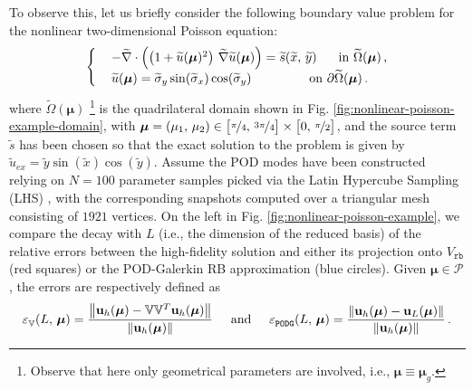 \documentclass[12pt, a4paper, twoside, openright, notitlepage]{report}
\numberwithin{equation}{chapter}
\theoremstyle{theorem}
\theoremstyle{definition}
\theoremstyle{remark}
\theoremstyle{proposition}
\numberwithin{figure}{chapter}
\newcommand{\norm}[1]{\left\lVert#1\right\rVert}
\newcommand{\wt}[1]{\widetilde{#1}}
\newcommand{\bg}[1]{\boldsymbol{#1}}
\begin{document}
		\noindent To observe this, let us briefly consider the following boundary value problem for the nonlinear two-dimensional Poisson equation:
		\begin{equation}
			\label{eq:nonlinear-poisson-example}
			\begin{cases}
				& - \wt{\nabla} \cdot \left( \big( 1 + \wt{u}(\bg{\mu})^2 \big) ~ \wt{\nabla} \wt{u}(\bg{\mu}) \right) = \wt{s}(\wt{x}, \, \wt{y}) \hspace*{0.6cm} \text{in $\wt{\Omega}(\boldsymbol{\mu})$} \, , \\
				& \wt{u}(\bg{\mu}) = \wt{\sigma}_y \sin(\wt{\sigma}_x) \cos(\wt{\sigma}_y) \hspace*{1.6cm} \text{on $\partial \wt{\Omega}(\boldsymbol{\mu})$} \, .
			\end{cases}
		\end{equation}
		where $\wt{\Omega}(\boldsymbol{\mu})$ \footnote{Observe that here only geometrical parameters are involved, i.e., $\bg{\mu} \equiv \bg{\mu}_g$.} is the quadrilateral domain shown in Fig. \ref{fig:nonlinear-poisson-example-domain}, with $\bg{\mu} = (\mu_1, \, \mu_2) \in \big[ \nicefrac{\pi}{4}, \, \nicefrac{3 \pi}{4} \big] \times \big[ 0, \, \nicefrac{\pi}{2} \big]$, and the source term $\wt{s}$ has been chosen so that the exact solution to the problem is given by $\wt{u}_{ex} = \wt{y} \sin(\wt{x}) \cos(\wt{y})$. Assume the POD modes have been constructed relying on $N = 100$ parameter samples picked via the Latin Hypercube Sampling (LHS) \cite{Imam08}, with the corresponding snapshots computed over a triangular mesh consisting of $1921$ vertices. On the left in Fig. \ref{fig:nonlinear-poisson-example}, we compare the decay with $L$ (i.e., the dimension of the reduced basis) of the relative errors between the high-fidelity solution and either its projection onto $V_{\texttt{rb}}$ (red squares) or the POD-Galerkin RB approximation (blue circles). Given $\bg{\mu} \in \mathcal{P}$, the errors are respectively defined as
		\begin{equation*}
			\varepsilon_{\mathbb{V}}^{}(L, \, \bg{\mu}) = \dfrac{\norm{\mathbf{u}_h(\bg{\mu}) - \mathbb{V} \mathbb{V}^T \mathbf{u}_h(\bg{\mu})}}{\norm{\mathbf{u}_h(\bg{\mu})}} \hspace*{0.5cm} \text{and} \hspace*{0.5cm} \varepsilon_{\texttt{PODG}}^{}(L, \, \bg{\mu}) = \dfrac{\norm{\mathbf{u}_h(\bg{\mu}) - \mathbf{u}_L(\bg{\mu})}}{\norm{\mathbf{u}_h(\bg{\mu})}} \, .
		\end{equation*}
\end{document}
